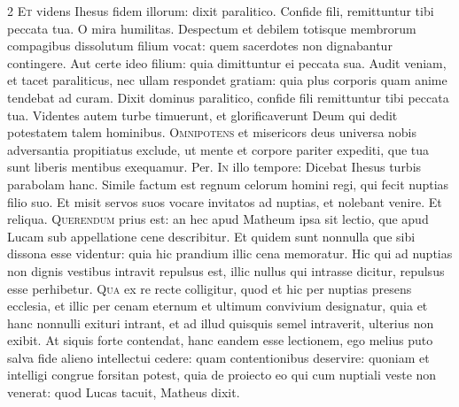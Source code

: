 \begin{multicols*}{2}
\lettrine[lines=2]{\zallmancaps \color{Red} E}{t} videns Ihesus fidem illorum: dixit paralitico. Confide fili, remittuntur tibi peccata tua. O mira humilitas. Despectum et debilem totisque membrorum compagibus dissolutum filium vocat: quem sacerdotes non dignabantur contingere. Aut certe ideo filium: quia dimittuntur ei peccata sua. Audit veniam, et tacet paraliticus, nec ullam respondet gratiam: quia plus corporis quam anime tendebat ad curam.
 Dixit dominus paralitico, confide fili remittuntur tibi peccata tua.
 Videntes autem turbe timuerunt, et glorificaverunt Deum qui dedit potestatem talem hominibus.
\lettrine[lines=2]{\zallmancaps \color{Blue} O}{mnipotens} et misericors deus universa nobis adversantia propitiatus exclude, ut mente et corpore pariter expediti, que tua sunt liberis mentibus exequamur. Per.
\lettrine[lines=2]{\zallmancaps \color{Red} I}{n} illo tempore: Dicebat Ihesus turbis parabolam hanc. Simile factum est regnum celorum homini regi, qui fecit nuptias filio suo. Et misit servos suos vocare invitatos ad nuptias, et nolebant venire. Et reliqua.
 \grecross
\lettrine[lines=2]{\zallmancaps \color{Blue} Q}{uerendum} prius est: an hec apud Matheum ipsa sit lectio, que apud Lucam sub appellatione cene describitur. Et quidem sunt nonnulla que sibi dissona esse videntur: quia hic prandium illic cena memoratur. Hic qui ad nuptias non dignis vestibus intravit repulsus est, illic nullus qui intrasse dicitur, repulsus esse perhibetur.
\lettrine[lines=2]{\zallmancaps \color{Red} Q}{ua} ex re recte colligitur, quod et hic per nuptias presens ecclesia, et illic per cenam eternum et ultimum convivium designatur, quia et hanc nonnulli exituri intrant, et ad illud quisquis semel intraverit, ulterius non exibit. At siquis forte contendat, hanc eandem esse lectionem, ego melius puto salva fide alieno intellectui cedere: quam contentionibus deservire: quoniam et intelligi congrue forsitan potest, quia de proiecto eo qui cum nuptiali veste non venerat: quod Lucas tacuit, Matheus dixit.

\end{multicols*}
